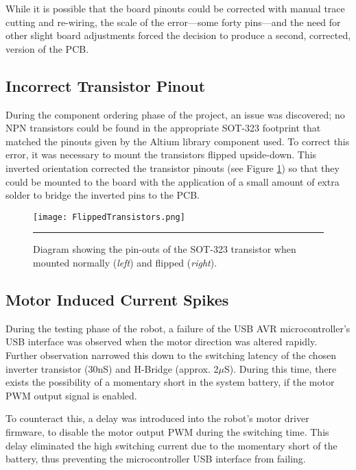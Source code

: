 While it is possible that the board pinouts could be corrected with manual trace cutting and re-wiring, the scale of the error---some forty pins---and the need for other slight board adjustments forced the decision to produce a second, corrected, version of the PCB.

\subsection{Incorrect Transistor Pinout}

During the component ordering phase of the project, an issue was discovered; no NPN transistors could be found in the appropriate SOT-323 footprint that matched the pinouts given by the Altium library component used. To correct this error, it was necessary to mount the transistors flipped upside-down. This inverted orientation corrected the transistor pinouts (see Figure \ref{fig:flippedtransistor}) so that they could be mounted to the board with the application of a small amount of extra solder to bridge the inverted pins to the PCB.

\begin{figure}[H]
	\centering
		\texttt{[image: FlippedTransistors.png]}
	\rule{35em}{0.5pt}
	\caption[Diagram of the normal and flipped SOT-323 Transistor]{Diagram showing the pin-outs of the SOT-323 transistor when mounted normally (\textit{left}) and flipped (\textit{right}).}
	\label{fig:flippedtransistor}
\end{figure}

\subsection{Motor Induced Current Spikes}

During the testing phase of the robot, a failure of the USB AVR microcontroller's USB interface was observed when the motor direction was altered rapidly. Further observation narrowed this down to the switching latency of the chosen inverter transistor (30nS) and H-Bridge (approx. 2$\mu$S). During this time, there exists the possibility of a momentary short in the system battery, if the motor PWM output signal is enabled.

To counteract this, a delay was introduced into the robot's motor driver firmware, to disable the motor output PWM during the switching time. This delay eliminated the high switching current due to the momentary short of the battery, thus preventing the microcontroller USB interface from failing.

